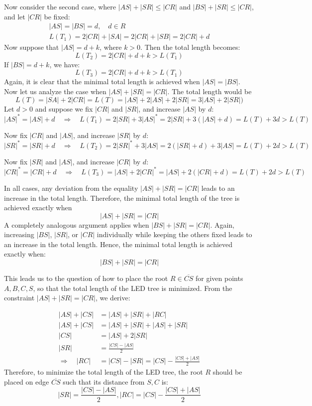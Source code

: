 \documentclass[12pt]{article}
\begin{document}
	Now consider the second case, where \( |AS| + |SR| \leq |CR| \) and \( |BS| + |SR| \leq |CR| \), and let \( |CR| \) be fixed:
	\begin{align*}
		|AS| = |BS| = d, \quad d \in R \\
		L(T_1) = 2|CR| + |SA| = 2|CR| + |SB| = 2|CR| + d
	\end{align*}
	Now suppose that \( |AS| = d + k \), where \( k > 0 \). Then the total length becomes:
	\[
	L(T_2) = 2|CR| + d + k > L(T_1)
	\]
	If \( |BS| = d + k \), we have:
	\[
	L(T_3) = 2|CR| + d + k > L(T_1)
	\]
	Again, it is clear that the minimal total length is achieved when \( |AS| = |BS| \).\\

	Now let us analyze the case when \(|AS|+|SR| = |CR| \).
	The total length would be \[ L(T) = |SA| + 2 |CR| = L(T) = |AS| + 2|AS| + 2|SR| = 3|AS| + 2|SR|  )\]
	Let \( d > 0 \) and suppose we fix \( |CR| \) and \( |SR| \), and increase \( |AS| \) by \( d \):
	\[
	|AS|^* = |AS| + d \quad \Rightarrow \quad L(T_1) = 2|SR| + 3|AS|^* = 2|SR| + 3(|AS| + d) = L(T) + 3d > L(T)
	\]
	
	Now fix \( |CR| \) and \( |AS| \), and increase \( |SR| \) by \( d \):
	\[
	|SR|^* = |SR| + d \quad \Rightarrow \quad L(T_2) = 2|SR|^* + 3|AS| = 2(|SR| + d) + 3|AS| = L(T) + 2d > L(T)
	\]
	
	Now fix \( |SR| \) and \( |AS| \), and increase \( |CR| \) by \( d \):
	\[
	|CR|^* = |CR| + d \quad \Rightarrow \quad L(T_3) = |AS| + 2|CR|^* = |AS| + 2(|CR| + d) = L(T) + 2d > L(T)
	\]
	
	In all cases, any deviation from the equality \( |AS| + |SR| = |CR| \) leads to an increase in the total length.  
	Therefore, the minimal total length of the tree is achieved exactly when
	\[
	|AS| + |SR| = |CR|
	\]
	A completely analogous argument applies when \( |BS| + |SR| = |CR| \).  
	Again, increasing \( |BS| \), \( |SR| \), or \( |CR| \) individually while keeping the others fixed leads to an increase in the total length.  
	Hence, the minimal total length is achieved exactly when:
	\[
	|BS| + |SR| = |CR|
	\]
	
	
	This leads us to the question of how to place the root \( R \in \overline{CS} \) for given points \( A, B, C, S \), so that the total length of the LED tree is minimized. From the constraint \( |AS|+|SR| = |CR|  \), we derive:
	
	\begin{align*}
		|AS| + |CS| &= |AS| + |SR| + |RC| \\
		|AS|+|CS| &= |AS|+|SR|+|AS|+|SR| \\ 
		|CS| &= |AS|+2|SR| \\
		|SR| &= \frac{|CS| - |AS|}{2} \\
		\Rightarrow \quad |RC| &= |CS| - |SR| = |CS| - \frac{|CS| + |AS|}{2}
	\end{align*}
	Therefore, to minimize the total length of the LED tree, the root \( R \) should be placed on edge \( \overline{CS} \) such that its distance from \( S, C\) is:
	\[
	|SR| = \frac{|CS| - |AS|}{2},  |RC| = |CS| - \frac{|CS| + |AS|}{2}
	\]
	
	
\end{document}
